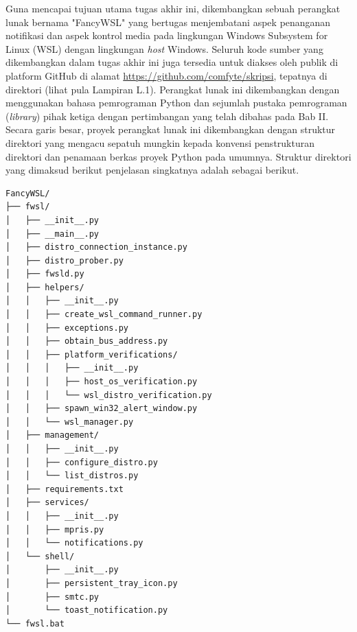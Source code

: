 Guna mencapai tujuan utama tugas akhir ini, dikembangkan sebuah perangkat lunak bernama "FancyWSL" yang bertugas menjembatani aspek penanganan notifikasi dan aspek kontrol media pada lingkungan Windows Subsystem for Linux (WSL) dengan lingkungan \textit{host} Windows. Seluruh kode sumber yang dikembangkan dalam tugas akhir ini juga tersedia untuk diakses oleh publik di platform GitHub di alamat \href{https://github.com/comfyte/skripsi}{https://github.com/comfyte/skripsi}, tepatnya di direktori  (lihat pula Lampiran L.1). Perangkat lunak ini dikembangkan dengan menggunakan bahasa pemrograman Python dan sejumlah pustaka pemrograman (\textit{library}) pihak ketiga dengan pertimbangan yang telah dibahas pada Bab II. Secara garis besar, proyek perangkat lunak ini dikembangkan dengan struktur direktori yang mengacu sepatuh mungkin kepada konvensi penstrukturan direktori dan penamaan berkas proyek Python pada umumnya. Struktur direktori yang dimaksud berikut penjelasan singkatnya adalah sebagai berikut.

\begin{verbatim}
FancyWSL/
├── fwsl/
│   ├── __init__.py
│   ├── __main__.py
│   ├── distro_connection_instance.py
│   ├── distro_prober.py
│   ├── fwsld.py
│   ├── helpers/
│   │   ├── __init__.py
│   │   ├── create_wsl_command_runner.py
│   │   ├── exceptions.py
│   │   ├── obtain_bus_address.py
│   │   ├── platform_verifications/
│   │   │   ├── __init__.py
│   │   │   ├── host_os_verification.py
│   │   │   └── wsl_distro_verification.py
│   │   ├── spawn_win32_alert_window.py
│   │   └── wsl_manager.py
│   ├── management/
│   │   ├── __init__.py
│   │   ├── configure_distro.py
│   │   └── list_distros.py
│   ├── requirements.txt
│   ├── services/
│   │   ├── __init__.py
│   │   ├── mpris.py
│   │   └── notifications.py
│   └── shell/
│       ├── __init__.py
│       ├── persistent_tray_icon.py
│       ├── smtc.py
│       └── toast_notification.py
└── fwsl.bat
\end{verbatim}

